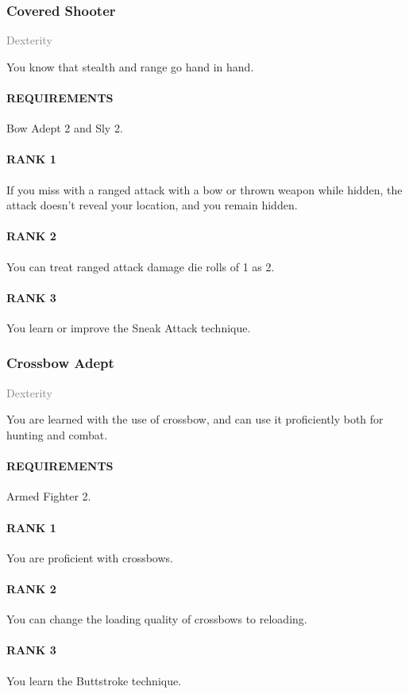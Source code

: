 \subsubsection{Covered Shooter} \label{tal::coveredshooter}
\small{\textcolor{gray}{Dexterity}}

\normalsize
You know that stealth and range go hand in hand.
\paragraph{REQUIREMENTS} Bow Adept 2 and Sly 2.
\paragraph{RANK 1} If you miss with a ranged attack with a bow or thrown weapon while hidden, the attack doesn't reveal your location, and you remain hidden.
\paragraph{RANK 2} You can treat ranged attack damage die rolls of 1 as 2.
\paragraph{RANK 3} You learn or improve the Sneak Attack technique.

\subsubsection{Crossbow Adept} \label{tal::crossbowadept}
\small{\textcolor{gray}{Dexterity}}

\normalsize
You are learned with the use of crossbow, and can use it proficiently both for hunting and combat.
\paragraph{REQUIREMENTS} Armed Fighter 2.
\paragraph{RANK 1} You are proficient with crossbows.
\paragraph{RANK 2} You can change the loading quality of crossbows to reloading.
\paragraph{RANK 3} You learn the Buttstroke technique.

